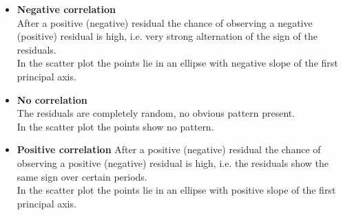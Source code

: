 \begin{itemize}
  \item \textbf{Negative correlation}\\
  After a positive (negative) residual the chance of observing a negative (positive) residual is high, i.e. very strong alternation of the sign of the residuals.\\
  In the scatter plot the points lie in an ellipse with negative slope of the first principal axis.
  \item \textbf{No correlation}\\
  The residuals are completely random, no obvious pattern present.\\
  In the scatter plot the points show no pattern.
  \item \textbf{Positive correlation}
  After a positive (negative) residual the chance of observing a positive (negative) residual is high, i.e. the residuals show the same sign over certain periods.\\
  In the scatter plot the points lie in an ellipse with positive slope of the first principal axis.
\end{itemize}
